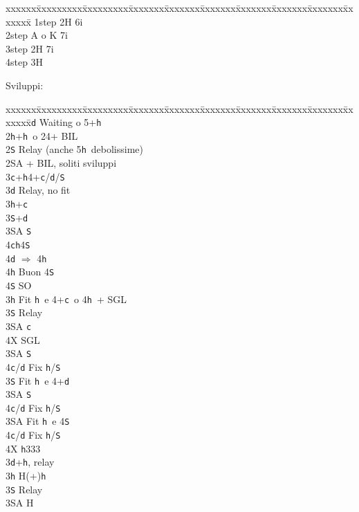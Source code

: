 \documentclass[a4paper,italian]{article}
\newcommand{\BS}{\small{\texttt{S}}}
\newcommand{\BC}{\small{\texttt{c}}}
\newcommand{\BD}{\small{\texttt{d}}}
\newcommand{\BH}{\small{\texttt{h}}}
\newenvironment{bidtable}
{\begin{tabbing}

    xxxxxx\=xxxxxxxxx\=xxxxxxxxx\=xxxxxxx\=xxxxxxx\=xxxxxxx\=xxxxxxx\=xxxxxxx\=xxxxxxx\=xxxxxxx\=\kill}
{\end{tabbing} }%
\newenvironment{varie}[1]
{\begin{tcolorbox}[colframe=green!40!black,title=#1]}
    {
\end{tcolorbox} }%
\begin{document}
\begin{multicols}{2}
\begin{varie}{(*) Relay richiesta onori}
        \begin{bidtable}
            1step \> 2H 6i\\
            2step \> A o K 7i\\
            3step \> 2H 7i\\
            4step \> 3H
        \end{bidtable}
    \end{varie}
    Sviluppi:
    \begin{bidtable}
        2\BD \> Waiting o 5+\BH \+\\
        2\BH {}+\BH\ o 24+ BIL\+\\
        2\BS \> Relay (anche 5\BH\ debolissime)\+\\
        2\small{SA} + BIL, soliti sviluppi\\
        3\BC {}+\BH4+\BC/\BD/\BS \+\\
        3\BD \> Relay, no fit\+\\
        3\BH {}+\BC \\
        3\BS {}+\BD \\
        3\small{SA} \BS \\
        4\BC {}\BH 4\BS \+\\
        4\BD \> $\Rightarrow$ 4\BH\\
        4\BH \> Buon 4\BS \\
        4\BS \> SO\-\-\\
        3\BH \> Fit \BH\ e 4+\BC\ o 4\BH\ + SGL\+\\
        3\BS \> Relay\+\\
        3\small{SA} \BC \\
        4X \> SGL\-\\
        3\small{SA} \BS \+\\
        4\BC/\BD \> Fix \BH/\BS\-\-\\
        3\BS \> Fit \BH\ e 4+\BD \+\\
        3\small{SA} \BS \+\\
        4\BC/\BD \> Fix \BH/\BS\-\-\\
        3\small{SA} \> Fit \BH\ e 4\BS \+\\
        4\BC/\BD \> Fix \BH/\BS\-\\
        4X \BH 333\-\\
        3\BD {}+\BH , relay\+\\
        3\BH \> H(+)\BH \+\\
        3\BS \> Relay\+\\
        3\small{SA} \> H\\

\end{bidtable}
\end{multicols}
\end{document}
